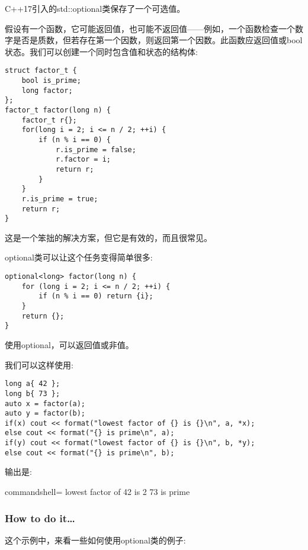
C++17引入的std::optional类保存了一个可选值。

假设有一个函数，它可能返回值，也可能不返回值——例如，一个函数检查一个数字是否是质数，但若存在第一个因数，则返回第一个因数。此函数应返回值或bool状态。我们可以创建一个同时包含值和状态的结构体:

\begin{lstlisting}[style=styleCXX]
struct factor_t {
	bool is_prime;
	long factor;
};
factor_t factor(long n) {
	factor_t r{};
	for(long i = 2; i <= n / 2; ++i) {
		if (n % i == 0) {
			r.is_prime = false;
			r.factor = i;
			return r;
		}
	}
	r.is_prime = true;
	return r;
}
\end{lstlisting}

这是一个笨拙的解决方案，但它是有效的，而且很常见。

optional类可以让这个任务变得简单很多:

\begin{lstlisting}[style=styleCXX]
optional<long> factor(long n) {
	for (long i = 2; i <= n / 2; ++i) {
		if (n % i == 0) return {i};
	}
	return {};
}
\end{lstlisting}

使用optional，可以返回值或非值。

我们可以这样使用:

\begin{lstlisting}[style=styleCXX]
long a{ 42 };
long b{ 73 };
auto x = factor(a);
auto y = factor(b);
if(x) cout << format("lowest factor of {} is {}\n", a, *x);
else cout << format("{} is prime\n", a);
if(y) cout << format("lowest factor of {} is {}\n", b, *y);
else cout << format("{} is prime\n", b);
\end{lstlisting}

输出是:

\begin{tcblisting}{commandshell={}}
lowest factor of 42 is 2
73 is prime
\end{tcblisting}

\subsubsection{How to do it…}

这个示例中，来看一些如何使用optional类的例子:

